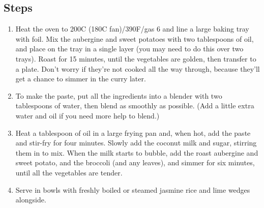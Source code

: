 \documentclass{book}
\begin{document}
\subsection*{Steps}
\begin{enumerate}
\item Heat the oven to 200C (180C fan)/390F/gas 6 and line a large baking tray with foil. Mix the aubergine and sweet potatoes with two tablespoons of oil, and place on the tray in a single layer (you may need to do this over two trays). Roast for 15 minutes, until the vegetables are golden, then transfer to a plate. Don’t worry if they’re not cooked all the way through, because they’ll get a chance to simmer in the curry later.
\item To make the paste, put all the ingredients into a blender with two tablespoons of water, then blend as smoothly as possible. (Add a little extra water and oil if you need more help to blend.)
\item Heat a tablespoon of oil in a large frying pan and, when hot, add the paste and stir-fry for four minutes. Slowly add the coconut milk and sugar, stirring them in to mix. When the milk starts to bubble, add the roast aubergine and sweet potato, and the broccoli (and any leaves), and simmer for six minutes, until all the vegetables are tender.
\item Serve in bowls with freshly boiled or steamed jasmine rice and lime wedges alongside.
\end{enumerate}
\newpage
\end{document}
